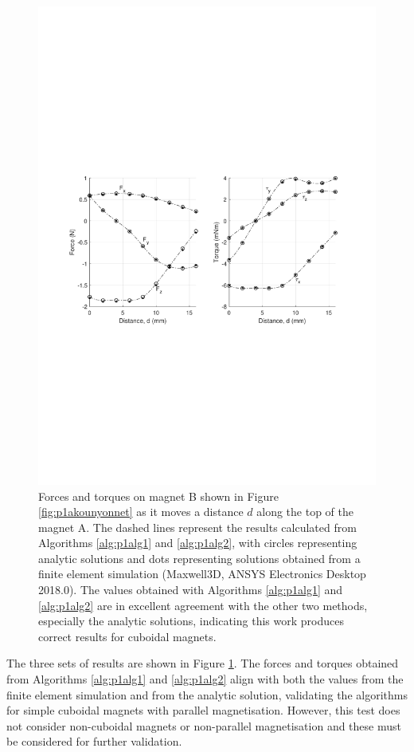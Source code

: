 \begin{figure}
	\centering
	\includegraphics[trim = 3cm 9cm 3cm 9cm,width=0.9\linewidth]{p1/p1FIG4}
	\caption{Forces and torques on magnet B shown in Figure \ref{fig:p1akounyonnet} as it moves a distance \(d\) along the top of the magnet A. The dashed lines represent the results calculated from Algorithms \ref{alg:p1alg1} and \ref{alg:p1alg2}, with circles representing analytic solutions \cite{Akoun1984,Janssen2010a} and dots representing solutions obtained from a finite element simulation (Maxwell3D, ANSYS Electronics Desktop 2018.0). The values obtained with Algorithms \ref{alg:p1alg1} and \ref{alg:p1alg2} are in excellent agreement with the other two methods, especially the analytic solutions, indicating this work produces correct results for cuboidal magnets.}
	\label{fig:p1cuboidcase}
\end{figure}

The three sets of results are shown in Figure \ref{fig:p1cuboidcase}. The forces and torques obtained from Algorithms \ref{alg:p1alg1} and \ref{alg:p1alg2} align with both the values from the finite element simulation and from the analytic solution, validating the algorithms for simple cuboidal magnets with parallel magnetisation. However, this test does not consider non-cuboidal magnets or non-parallel magnetisation and these must be considered for further validation.

